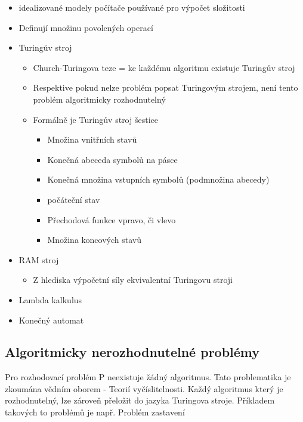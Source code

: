 \documentclass[10pt,a4paper]{article}
\begin{document}
\begin{itemize}
\item idealizované modely počítače používané pro výpočet složitosti
\item Definují množinu povolených operací
\item Turingův stroj
\begin{itemize}
\item Church-Turingova teze = ke každému algoritmu existuje Turingův stroj
\item Respektive pokud nelze problém popsat Turingovým strojem, není tento problém algoritmicky rozhodnutelný
\item Formálně je Turingův stroj šestice
\begin{itemize}
\item Množina vnitřních stavů
\item Konečná abeceda symbolů na pásce
\item Konečná množina vstupních symbolů (podmnožina abecedy)
\item počáteční stav
\item Přechodová funkce vpravo, či vlevo
\item Množina koncových stavů
\end{itemize}
\end{itemize}
\item RAM stroj
\begin{itemize}
\item Z hlediska výpočetní síly ekvivalentní Turingovu stroji
\end{itemize}
\item Lambda kalkulus
\item Konečný automat
\end{itemize}

\subsection{Algoritmicky nerozhodnutelné problémy}
Pro rozhodovací problém P neexistuje žádný algoritmus. Tato problematika je zkoumána vědním oborem - Teorií vyčíslitelnosti. Každý algoritmus který je rozhodnutelný, lze zároveň přeložit do jazyka Turingova stroje.
Příkladem takových to problémů je např. Problém zastavení
\end{document}
